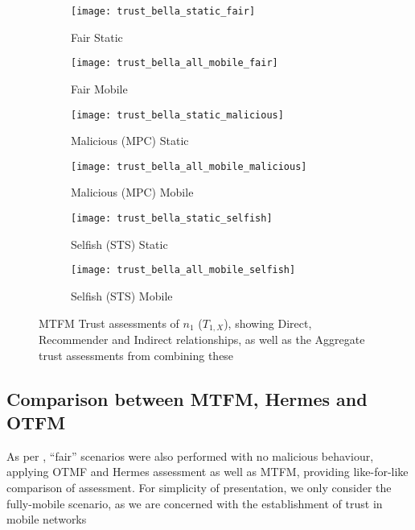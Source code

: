 \begin{figure}[h]
	\centering
	\begin{subfigure}{0.5\textwidth}
	\caption{Fair Static}
	\texttt{[image: trust\_bella\_static\_fair]} 
	\label{fig:trust_static}
	\end{subfigure}%
	\begin{subfigure}{0.5\textwidth}
	\caption{Fair Mobile}
	\texttt{[image: trust\_bella\_all\_mobile\_fair]}  
	\label{fig:trust_all_mobile}
	\end{subfigure}%
	
	\begin{subfigure}{0.5\textwidth}
	\caption{Malicious (MPC) Static}
	\texttt{[image: trust\_bella\_static\_malicious]} 
	\label{fig:trust_static_mal}
	\end{subfigure}%
	\begin{subfigure}{0.5\textwidth}
	\caption{Malicious (MPC) Mobile}
	\texttt{[image: trust\_bella\_all\_mobile\_malicious]}  
	\label{fig:trust_all_mobile_mal}
	\end{subfigure}%
	
	\begin{subfigure}{0.5\textwidth}
	\caption{Selfish (STS) Static}
	\texttt{[image: trust\_bella\_static\_selfish]}
	\label{fig:trust_static_sel}
	\end{subfigure}%
	\begin{subfigure}{0.5\textwidth}
	\caption{Selfish (STS) Mobile}
	\texttt{[image: trust\_bella\_all\_mobile\_selfish]}  \label{fig:trust_all_mobile_sel}
	\end{subfigure}%

	\caption{MTFM Trust assessments of $n_1$ ($T_{1,X}$), showing Direct, Recommender and Indirect relationships, as well as the Aggregate trust assessments from combining these} 
	\label{fig:trust_mobility}
\end{figure}
%

\subsection{Comparison between MTFM, Hermes and OTFM}
As per \cite{Guo11}, ``fair'' scenarios were also performed with no malicious behaviour, applying OTMF and Hermes assessment as well as MTFM, providing like-for-like comparison of assessment.
For simplicity of presentation, we only consider the fully-mobile scenario, as we are concerned with the establishment of trust in mobile networks

